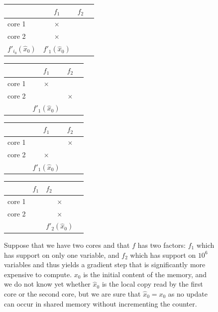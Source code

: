 \documentclass[twoside, 11pt]{article}
\begin{document}
\begin{figure}
	\centering
	\begin{tabular}{llll}
		& \multicolumn{1}{c}{$f_1$} & $f_2$   \\
		\midrule
		core 1 & \multicolumn{1}{c}{$\times$} &          \\
		core 2 & \multicolumn{1}{c}{$\times$} &          \\
		\midrule[0.9pt]
		\vspace{4mm}
		{\color{red}$f'_{i_0}(\hat{x}_0)$} & $f'_1(\hat{x}_0)$ &  \\
	\end{tabular}
	\begin{tabular}{llll}
		& \multicolumn{1}{c}{$f_1$} & $f_2$ \\
		\midrule
		core 1 & \multicolumn{1}{c}{$\times$} &          \\
		core 2 &  &  \multicolumn{1}{c}{$\times$}     \\
		\midrule[0.9pt]
		\vspace{4mm}
		 & $f'_1(\hat{x}_0)$ &  \\
	\end{tabular}
	\begin{tabular}{llll}
		& \multicolumn{1}{c}{$f_1$} & $f_2$ \\
		\midrule
		core 1 &  &    \multicolumn{1}{c}{$\times$}      \\
		core 2 & \multicolumn{1}{c}{$\times$} &         \\
		\midrule[0.9pt]
		\vspace{4mm}
		 & $f'_1(\hat{x}_0)$ &  \\
	\end{tabular}
	\begin{tabular}{llll}
		& \multicolumn{1}{c}{$f_1$} & $f_2$ \\
		\midrule
		core 1 & &    \multicolumn{1}{c}{$\times$}      \\
		core 2 & &     \multicolumn{1}{c}{$\times$}     \\
		\midrule[0.9pt]
		\vspace{4mm}
		 &  & $f'_2(\hat{x}_0)$ \\
	\end{tabular}
	\caption{\label{fig:afterwritebias}
		\footnotesize
		Suppose that we have two cores and that $f$ has two factors: $f_1$ which has support on only one variable, and $f_2$ which has support on $10^6$ variables and thus yields a gradient step that is significantly more expensive to compute.
		$x_0$ is the initial content of the memory, and we do not know yet whether $\hat{x}_0$ is the local copy read by the first core or the second core, but we are sure that $\hat{x}_0 = x_0$ as no update can occur in shared memory without incrementing the counter.
}
\end{figure}
\end{document}
